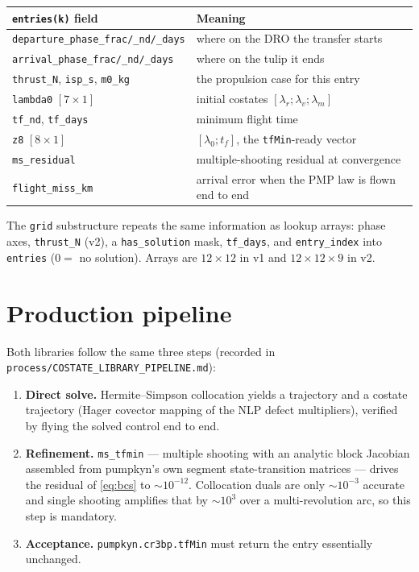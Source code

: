 \documentclass[11pt]{article}
\begin{document}
\begin{center}
\begin{tabular}{ll}
\toprule
\textbf{\texttt{entries(k)} field} & \textbf{Meaning} \\
\midrule
\texttt{departure\_phase\_frac/\_nd/\_days} & where on the DRO the transfer starts \\
\texttt{arrival\_phase\_frac/\_nd/\_days}   & where on the tulip it ends \\
\texttt{thrust\_N}, \texttt{isp\_s}, \texttt{m0\_kg} & the propulsion case for this entry \\
\texttt{lambda0} $[7\times1]$ & initial costates $[\lambda_r;\lambda_v;\lambda_m]$ \\
\texttt{tf\_nd}, \texttt{tf\_days} & minimum flight time \\
\texttt{z8} $[8\times1]$ & $[\lambda_0; t_f]$, the \texttt{tfMin}-ready vector \\
\texttt{ms\_residual} & multiple-shooting residual at convergence \\
\texttt{flight\_miss\_km} & arrival error when the PMP law is flown end to end \\
\bottomrule
\end{tabular}
\end{center}

The \texttt{grid} substructure repeats the same information as lookup arrays:
phase axes, \texttt{thrust\_N} (v2), a \texttt{has\_solution} mask,
\texttt{tf\_days}, and \texttt{entry\_index} into \texttt{entries}
($0 =$ no solution). Arrays are $12\times12$ in v1 and $12\times12\times9$ in
v2.

\section{Production pipeline}

Both libraries follow the same three steps (recorded in
\texttt{process/COSTATE\_LIBRARY\_PIPELINE.md}):

\begin{enumerate}
\item \textbf{Direct solve.} Hermite--Simpson collocation yields a trajectory
and a costate trajectory (Hager covector mapping of the NLP defect
multipliers), verified by flying the solved control end to end.
\item \textbf{Refinement.} \texttt{ms\_tfmin} --- multiple shooting with an
analytic block Jacobian assembled from pumpkyn's own segment state-transition
matrices --- drives the residual of \eqref{eq:bcs} to $\sim10^{-12}$.
Collocation duals are only $\sim10^{-3}$ accurate and single shooting
amplifies that by $\sim10^3$ over a multi-revolution arc, so this step is
mandatory.
\item \textbf{Acceptance.} \texttt{pumpkyn.cr3bp.tfMin} must return the entry
essentially unchanged.
\end{enumerate}
\end{document}
